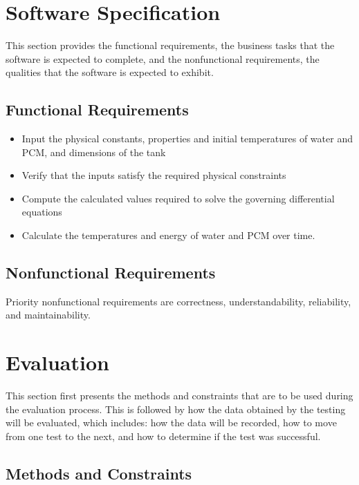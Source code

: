 \documentclass[12pt]{article}
\begin{document}
%
%

\section{ Software Specification}
This section provides the functional requirements, the business tasks that the
software is expected to complete, and the nonfunctional requirements, the
qualities that the software is expected to exhibit.

\subsection{Functional Requirements}

\noindent
\begin{itemize}
\item Input the physical constants, properties and initial temperatures of water
 and PCM, and dimensions of the tank  
\item Verify that the inputs satisfy the required physical constraints 
\item Compute the calculated values required to solve the governing differential equations
\item Calculate the temperatures and energy of water and PCM over time.
\end{itemize} 

\subsection{Nonfunctional Requirements}
Priority nonfunctional requirements are correctness, understandability, reliability, and maintainability. 


%
%

\section{Evaluation}
This section first presents the methods and constraints that are to be used during
the evaluation process. This is followed by how the data obtained by the testing will be 
evaluated, which includes: how the data will be recorded, how to move from one test
to the next, and how to determine if the test was successful. 

\subsection{ Methods and Constraints} 
\end{document}
